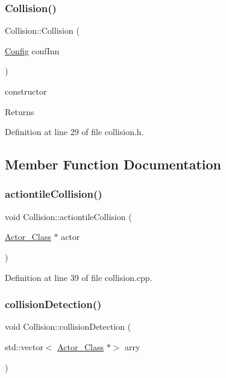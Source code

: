 \subsubsection{\texorpdfstring{Collision()}{Collision()}}
{\footnotesize\ttfamily Collision\+::\+Collision (\begin{DoxyParamCaption}\item[{\hyperlink{class_config}{Config}}]{conf\+Inn }\end{DoxyParamCaption})\hspace{0.3cm}{\ttfamily [inline]}}

constructor \begin{DoxyReturn}{Returns}

\end{DoxyReturn}


Definition at line 29 of file collision.\+h.



\subsection{Member Function Documentation}
\hypertarget{class_collision_ad09862825e2bec3369c53dbbca1ed7fb}{}\label{class_collision_ad09862825e2bec3369c53dbbca1ed7fb} 
\subsubsection{\texorpdfstring{actiontile\+Collision()}{actiontileCollision()}}
{\footnotesize\ttfamily void Collision\+::actiontile\+Collision (\begin{DoxyParamCaption}\item[{\hyperlink{class_actor___class}{Actor\+\_\+\+Class} $\ast$}]{actor }\end{DoxyParamCaption})}



Definition at line 39 of file collision.\+cpp.

\hypertarget{class_collision_aee423e34a3e0afa46842928df3c39d54}{}\label{class_collision_aee423e34a3e0afa46842928df3c39d54} 
\subsubsection{\texorpdfstring{collision\+Detection()}{collisionDetection()}}
{\footnotesize\ttfamily void Collision\+::collision\+Detection (\begin{DoxyParamCaption}\item[{std\+::vector$<$ \hyperlink{class_actor___class}{Actor\+\_\+\+Class} $\ast$$>$}]{arry }\end{DoxyParamCaption})}



